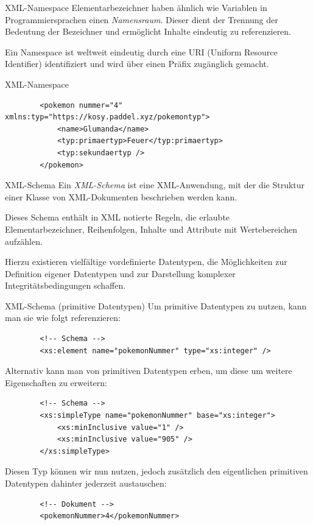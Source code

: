 \begin{defi}{XML-Namespace}
    Elementarbezeichner haben ähnlich wie Variablen in Programmiersprachen einen \emph{Namensraum}.
    Dieser dient der Trennung der Bedeutung der Bezeichner und ermöglicht Inhalte eindeutig zu referenzieren.

    Ein Namespace ist weltweit eindeutig durch eine URI (Uniform Resource Identifier) identifiziert und wird über einen Präfix zugänglich gemacht.
\end{defi}

\begin{example}{XML-Namespace}
    \begin{lstlisting}
        <pokemon nummer="4" xmlns:typ="https://kosy.paddel.xyz/pokemontyp">
            <name>Glumanda</name>
            <typ:primaertyp>Feuer</typ:primaertyp>
            <typ:sekundaertyp />
        </pokemon>
    \end{lstlisting}
\end{example}

\begin{defi}{XML-Schema}
    Ein \emph{XML-Schema} ist eine XML-Anwendung, mit der die Struktur einer Klasse von XML-Dokumenten beschrieben werden kann.

    Dieses Schema enthält in XML notierte Regeln, die erlaubte Elementarbezeichner, Reihenfolgen, Inhalte und Attribute mit Wertebereichen aufzählen.

    Hierzu existieren vielfältige vordefinierte Datentypen, die Möglichkeiten zur Definition eigener Datentypen und zur Darstellung komplexer Integritätsbedingungen schaffen.
\end{defi}

\begin{example}{XML-Schema (primitive Datentypen)}
    Um primitive Datentypen zu nutzen, kann man sie wie folgt referenzieren:

    \begin{lstlisting}
        <!-- Schema -->
        <xs:element name="pokemonNummer" type="xs:integer" />
    \end{lstlisting}

    Alternativ kann man von primitiven Datentypen erben, um diese um weitere Eigenschaften zu erweitern:

    \begin{lstlisting}
        <!-- Schema -->
        <xs:simpleType name="pokemonNummer" base="xs:integer">
            <xs:minInclusive value="1" />
            <xs:minInclusive value="905" />
        </xs:simpleType>
    \end{lstlisting}

    Diesen Typ können wir nun nutzen, jedoch zusätzlich den eigentlichen primitiven Datentypen dahinter jederzeit austauschen:

    \begin{lstlisting}
        <!-- Dokument -->
        <pokemonNummer>4</pokemonNummer>
    \end{lstlisting}
\end{example}


